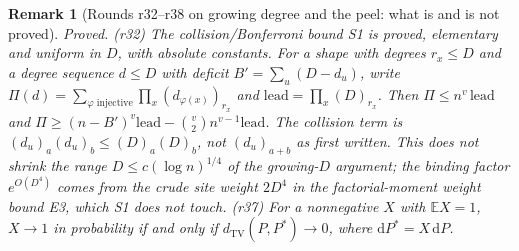 \documentclass[11pt]{article}
\newtheorem{remark}[theorem]{Remark}
\newcommand{\EE}{\mathbb{E}}
\newcommand{\dTV}{d_{\mathrm{TV}}}
\begin{document}
\begin{remark}[Rounds r32--r38 on growing degree and the peel: what is and is not proved]
\label{rem:rounds-r32-r38}
\emph{Proved.}
(r32) The collision/Bonferroni bound S1 is proved, elementary and uniform in
\(D\), with absolute constants. For a shape with degrees \(r_x\le D\) and a degree
sequence \(d\le D\) with deficit \(B'=\sum_u(D-d_u)\), write
\(\Pi(d)=\sum_{\varphi\text{ injective}}\prod_x(d_{\varphi(x)})_{r_x}\) and
\(\mathrm{lead}=\prod_x(D)_{r_x}\). Then \(\Pi\le n^v\,\mathrm{lead}\) and
\(\Pi\ge(n-B')^v\mathrm{lead}-\binom v2n^{v-1}\mathrm{lead}\). The collision
term is \((d_u)_a(d_u)_b\le(D)_a(D)_b\), not \((d_u)_{a+b}\) as first written.
This does not shrink the range \(D\le c(\log n)^{1/4}\) of the growing-\(D\) argument;
the binding factor \(e^{O(D^4)}\) comes from the crude site weight \(2D^4\) in
the factorial-moment weight bound E3, which S1 does not touch.
(r37) For a nonnegative \(X\) with \(\EE X=1\), \(X\to1\) in probability if and
only if \(\dTV(P,P^*)\to0\), where \(\mathrm dP^*=X\,\mathrm dP\).


\end{remark}
\end{document}
